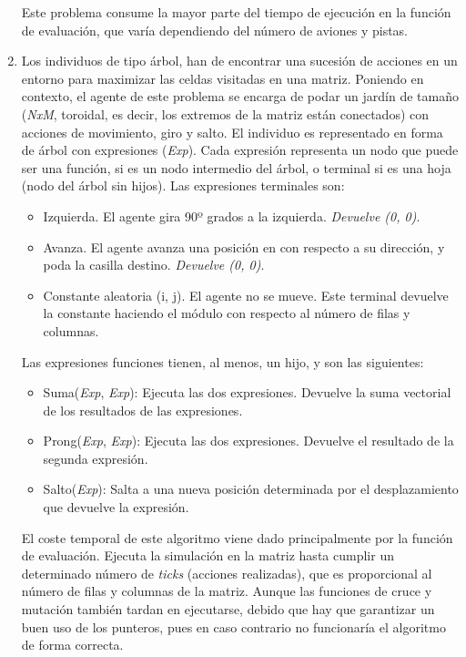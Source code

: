 \begin{enumerate}
		
		Este problema consume la mayor parte del tiempo de ejecución en la función de evaluación, que varía dependiendo del número de aviones y pistas. 
		
		
		
		\item Los individuos de tipo árbol, han de encontrar una sucesión de acciones en un entorno para maximizar las celdas visitadas en una matriz. Poniendo en contexto, el agente de este problema se encarga de podar un jardín de tamaño (\textit{NxM}, toroidal, es decir, los extremos de la matriz están conectados) con acciones de movimiento, giro y salto. El individuo es representado en forma de árbol con expresiones (\textit{Exp}). Cada expresión representa un nodo que puede ser una función, si es un nodo intermedio del árbol, o terminal si es una hoja (nodo del árbol sin hijos). Las expresiones terminales son:
		\begin{itemize}
			\item Izquierda. El agente gira 90º grados a la izquierda. \textit{Devuelve (0, 0)}.
			\item Avanza. El agente avanza una posición en con respecto a su dirección, y poda la casilla destino. \textit{Devuelve (0, 0)}.
			\item Constante aleatoria (i, j). El agente no se mueve. Este terminal devuelve la constante haciendo el módulo con respecto al número de filas y columnas.
		\end{itemize}
		
		Las expresiones funciones tienen, al menos, un hijo, y son las siguientes:
		\begin{itemize}
			\item Suma(\textit{Exp}, \textit{Exp}): Ejecuta las dos expresiones. Devuelve la suma vectorial de los resultados de las expresiones.
			\item Prong(\textit{Exp}, \textit{Exp}): Ejecuta las dos expresiones. Devuelve el resultado de la segunda expresión.
			\item Salto(\textit{Exp}): Salta a una nueva posición determinada por el desplazamiento que devuelve la expresión. 
		\end{itemize}
		
				
		El coste temporal de este algoritmo viene dado principalmente por la función de evaluación. Ejecuta la simulación en la matriz hasta cumplir un determinado número de \textit{ticks} (acciones realizadas), que es proporcional al número de filas y columnas de la matriz. Aunque las funciones de cruce y mutación también tardan en ejecutarse, debido que hay que garantizar un buen uso de los punteros, pues en caso contrario no funcionaría el algoritmo de forma correcta.
	\end{enumerate}
	
